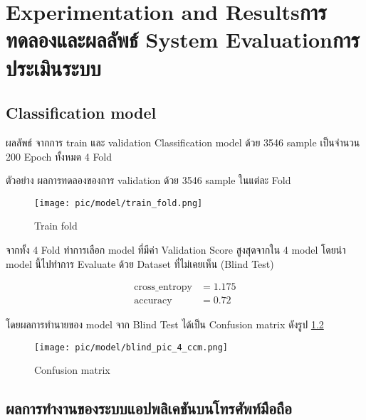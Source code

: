 \chapter{\ifproject%
      \ifenglish Experimentation and Results\else การทดลองและผลลัพธ์\fi
  \else%
      \ifenglish System Evaluation\else การประเมินระบบ\fi
  \fi}


\section{Classification model}
\par ผลลัพธ์ จากการ train และ validation  Classification model ด้วย 3546 sample เป็นจำนวน 200 Epoch
ทั้งหมด 4 Fold


\par ตัวอย่าง ผลการทดลองของการ validation ด้วย 3546 sample ในแต่ละ Fold
\begin{figure}[h]
    \begin{center}

        \texttt{[image: pic/model/train\_fold.png]}
    \end{center}

    \caption[Train fold]{Train fold}
    \label{fig:Train fold}
\end{figure}

จากทั้ง 4 Fold ทำการเลือก model ที่มีค่า Validation Score สูงสุดจากใน 4 model
โดยนำ model นี้ไปทำการ Evaluate ด้วย Dataset ที่ไม่เคยเห็น (Blind Test)


\begin{align}
    \text{cross\_entropy} & = 1.175 \\
    \text{accuracy}       & = 0.72
\end{align}


โดยผลการทำนายของ model  จาก Blind Test ได้เป็น Confusion matrix ดังรูป \ref{fig:Confusion matrix}
\begin{figure}[h]
    \begin{center}

        \texttt{[image: pic/model/blind\_pic\_4\_ccm.png]}
    \end{center}

    \caption[Confusion matrix]{Confusion matrix}
    \label{fig:Confusion matrix}
\end{figure}




\newpage
\section{ผลการทำงานของระบบแอปพลิเคชันบนโทรศัพท์มือถือ}



